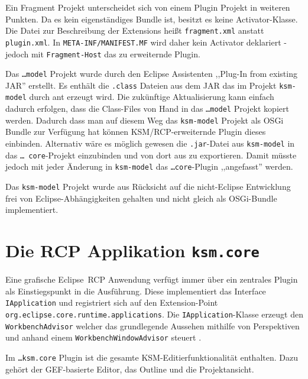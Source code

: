 \documentclass[%
12pt,titlepage,abstracton,DIV=10,BCOR=0.5cm]{scrreprt}
\begin{document}
Ein Fragment Projekt unterscheidet sich von einem Plugin Projekt in weiteren
Punkten. Da es kein eigenständiges Bundle ist, besitzt es keine
Activator-Klasse. Die Datei zur Beschreibung der Extensions heißt
\texttt{fragment.xml} anstatt \texttt{plugin.xml}. In
\texttt{META-INF/MANIFEST.MF} wird daher kein Activator deklariert - jedoch mit
\texttt{Frag\-ment-Host} das zu erweiternde Plugin.

Das \texttt{\ldots model} Projekt wurde durch den Eclipse Assistenten ,,Plug-In
from existing JAR'' erstellt. Es enthält die \texttt{.class} Dateien aus dem JAR
das im Projekt \texttt{ksm-model} durch ant erzeugt wird. Die zukünftige
Aktualisierung kann einfach dadurch erfolgen, dass die Class-Files von Hand in
das \texttt{\ldots model} Projekt kopiert werden. Dadurch dass man auf diesem
Weg das \texttt{ksm-model} Projekt als OSGi Bundle zur Verfügung hat können
KSM/RCP-erweiternde Plugin dieses einbinden. Alternativ wäre es möglich gewesen
die \texttt{.jar}-Datei aus \texttt{ksm-model} in das \texttt{\ldots
core}-Projekt einzubinden und von dort aus zu exportieren. Damit müsste jedoch
mit jeder Änderung in \texttt{ksm-model} das \texttt{\ldots core}-Plugin
,,angefasst'' werden.

Das \texttt{ksm-model} Projekt wurde aus Rücksicht auf die
nicht-Eclipse Entwicklung frei von Eclipse-Abhängigkeiten gehalten und nicht
gleich als OSGi-Bundle implementiert.


\section{Die RCP Applikation \texttt{ksm.\-core}}
Eine grafische Eclipse~RCP Anwendung verfügt immer über ein zentrales Plugin als
Einstiegspunkt in die Ausführung. Diese implementiert das Interface
\texttt{IApplication} und registriert sich auf den Extension-Point
\texttt{org.\-eclipse.\-core.\-runtime.\-app\-licat\-ions}. Die
\texttt{IApplication}-Klasse erzeugt den \texttt{Work\-be\-nch\-Advisor} welcher
das grundlegende Aussehen mithilfe von Perspektiven und anhand einem
\texttt{Work\-bench\-Window\-Advisor} steuert \cite{vogelrcp}.

Im \texttt{\ldots ksm.core} Plugin ist die gesamte KSM-Editierfunktionalität
enthalten. Dazu gehört der GEF-basierte Editor, das Outline und die
Projektansicht.
\end{document}

